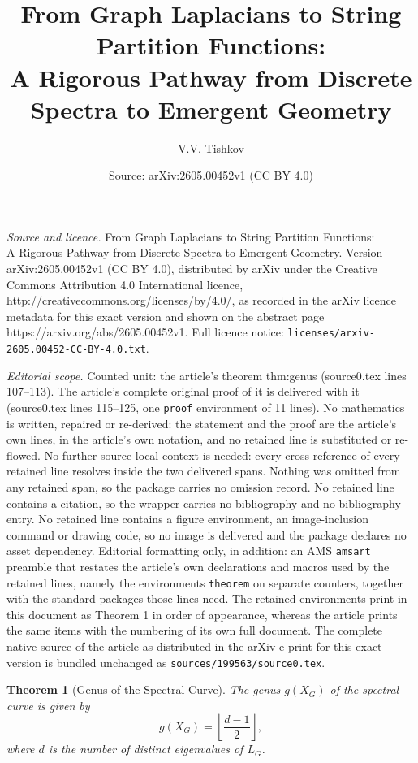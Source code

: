 \documentclass[10pt,a4paper]{amsart}
\title{From Graph Laplacians to String Partition Functions: \\ A Rigorous Pathway from Discrete Spectra to Emergent Geometry}
\author{V.V. Tishkov}
\date{Source: arXiv:2605.00452v1 (CC BY 4.0)}
\newtheorem{theorem}{Theorem}
\begin{document}
\maketitle

\noindent\emph{Source and licence.} From Graph Laplacians to String Partition Functions: \\ A Rigorous Pathway from Discrete Spectra to Emergent Geometry. Version arXiv:2605.00452v1 (CC BY 4.0), distributed by arXiv under the Creative Commons Attribution 4.0 International licence, http://creativecommons.org/licenses/by/4.0/, as recorded in the arXiv licence metadata for this exact version and shown on the abstract page https://arxiv.org/abs/2605.00452v1. Full licence notice: \texttt{licenses/arxiv-2605.00452-CC-BY-4.0.txt}.\par\smallskip

\noindent\textit{Editorial scope.} Counted unit: the article's theorem thm:genus (source0.tex lines 107--113). The article's complete original proof of it is delivered with it (source0.tex lines 115--125, one \texttt{proof} environment of 11 lines). No mathematics is written, repaired or re-derived: the statement and the proof are the article's own lines, in the article's own notation, and no retained line is substituted or re-flowed.  No further source-local context is needed: every cross-reference of every retained line resolves inside the two delivered spans.  Nothing was omitted from any retained span, so the package carries no omission record.  No retained line contains a citation, so the wrapper carries no bibliography and no bibliography entry.  No retained line contains a figure environment, an image-inclusion command or drawing code, so no image is delivered and the package declares no asset dependency.  Editorial formatting only, in addition: an AMS \texttt{amsart} preamble that restates the article's own declarations and macros used by the retained lines, namely the environments \texttt{theorem} on separate counters, together with the standard packages those lines need.  The retained environments print in this document as Theorem 1 in order of appearance, whereas the article prints the same items with the numbering of its own full document.  The complete native source of the article as distributed in the arXiv e-print for this exact version is bundled unchanged as \texttt{sources/199563/source0.tex}.
\begin{theorem}[Genus of the Spectral Curve]\label{thm:genus}
The genus $g(X_G)$ of the spectral curve is given by
\[
g(X_G) = \left\lfloor \frac{d-1}{2} \right\rfloor,
\]
where $d$ is the number of distinct eigenvalues of $L_G$.
\end{theorem}
\end{document}
